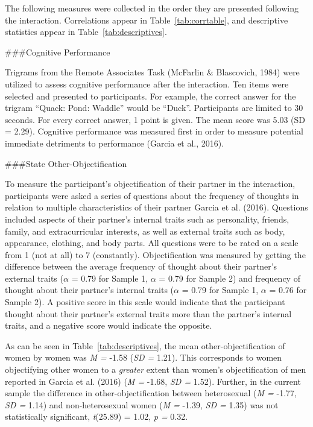\documentclass[
  man]{apa6}
\begin{document}
The following measures were collected in the order they are presented following the interaction. Correlations appear in Table~\ref{tab:corrtable}, and descriptive statistics appear in Table~\ref{tab:descriptives}.

\#\#\#Cognitive Performance

Trigrams from the Remote Associates Task (McFarlin \& Blascovich, 1984) were utilized to assess cognitive performance after the interaction. Ten items were selected and presented to participants. For example, the correct answer for the trigram \enquote{Quack: Pond: Waddle} would be \enquote{Duck}. Participants are limited to 30 seconds. For every correct answer, 1 point is given. The mean score was 5.03 (SD = 2.29). Cognitive performance was measured first in order to measure potential immediate detriments to performance (Garcia et al., 2016).

\#\#\#State Other-Objectification

To measure the participant's objectification of their partner in the interaction, participants were asked a series of questions about the frequency of thoughts in relation to multiple characteristics of their partner Garcia et al. (2016). Questions included aspects of their partner's internal traits such as personality, friends, family, and extracurricular interests, as well as external traits such as body, appearance, clothing, and body parts. All questions were to be rated on a scale from 1 (not at all) to 7 (constantly). Objectification was measured by getting the difference between the average frequency of thought about their partner's external traits (\(\alpha\) = 0.79 for Sample 1, \(\alpha\) = 0.79 for Sample 2) and frequency of thought about their partner's internal traits (\(\alpha\) = 0.79 for Sample 1, \(\alpha\) = 0.76 for Sample 2). A positive score in this scale would indicate that the participant thought about their partner's external traits more than the partner's internal traits, and a negative score would indicate the opposite.

As can be seen in Table~\ref{tab:descriptives}, the mean other-objectification of women by women was \emph{M =} -1.58 (\emph{SD =} 1.21). This corresponds to women objectifying other women to a \emph{greater} extent than women's objectification of men reported in Garcia et al. (2016) (\emph{M =} -1.68, \emph{SD =} 1.52). Further, in the current sample the difference in other-objectification between heterosexual (\emph{M =} -1.77, \emph{SD =} 1.14) and non-heterosexual women (\emph{M =} -1.39, \emph{SD =} 1.35) was not statistically significant, \emph{t}(25.89) = 1.02, \emph{p =} 0.32.
\end{document}
